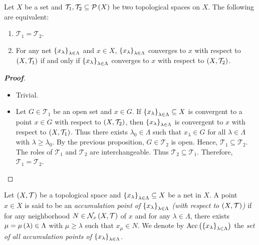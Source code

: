\begin{proposition}
  Let $X$ be a set and $\mathcal{T}_1,\mathcal{T}_2\subseteq\mathcal{P}\left(X\right)$ be two topological spaces on $X$. The following are equivalent:
  
  \begin{enumerate}
    \item $\mathcal{T}_1=\mathcal{T}_2$.
    \item For any net $\left\{x_\lambda\right\}_{\lambda\in\Lambda}$ and $x\in X$, $\left\{x_{\lambda}\right\}_{\lambda\in\Lambda}$ converges to $x$ with respect to $\left(X,\mathcal{T}_1\right)$ if and only if $\left\{x_{\lambda}\right\}_{\lambda\in\Lambda}$ converges to $x$ with respect to $\left(X,\mathcal{T}_2\right)$.
  \end{enumerate}

  \begin{proof}[\rm\textbf{Proof}]
    \hfill
    \begin{itemize}
      \item[\boxed{1\Rightarrow2}] Trivial.
      \item[\boxed{2\Rightarrow1}] Let $G\in\mathcal{T}_1$ be an open set and $x\in G$. If $\left\{x_\lambda\right\}_{\lambda\in\Lambda}\subseteq X$ is convergent to a point $x\in G$ with respect to $\left(X,\mathcal{T}_2\right)$, then $\left\{x_\lambda\right\}_{\lambda\in\Lambda}$ is convergent to $x$ with respect to $\left(X,\mathcal{T}_1\right)$. Thus there exists $\lambda_0\in\Lambda$ such that $x_\lambda\in G$ for all $\lambda\in\Lambda$ with $\lambda\geq\lambda_0$. By the previous proposition, $G\in\mathcal{T}_2$ is open. Hence, $\mathcal{T}_1\subseteq\mathcal{T}_2$. The roles of $\mathcal{T}_1$ and $\mathcal{T}_2$ are interchangeable. Thus $\mathcal{T}_2\subseteq\mathcal{T}_1$. Therefore, $\mathcal{T}_1=\mathcal{T}_2$.
    \end{itemize}
  \end{proof}
\end{proposition}

\begin{definition}
  Let $\left(X,\mathcal{T}\right)$ be a topological space and $\left\{x_\lambda\right\}_{\lambda\in\Lambda}\subseteq X$ be a net in $X$. A point $x\in X$ is said to be an \textit{accumulation point of $\left\{x_\lambda\right\}_{\lambda\in\Lambda}$ (with respect to $\left(X,\mathcal{T}\right)$)} if for any neighborhood $N\in\mathcal{N}_x\left(X,\mathcal{T}\right)$ of $x$ and for any $\lambda\in\Lambda$, there exists $\mu=\mu\left(\lambda\right)\in\Lambda$ with $\mu\geq\lambda$ such that $x_{\mu}\in N$. We denote by $\text{Acc}\left(\left\{x_{\lambda}\right\}_{\lambda\in\Lambda}\right)$ the \textit{set of all accumulation points of $\left\{x_{\lambda}\right\}_{\lambda\in\Lambda}$}.
\end{definition}

